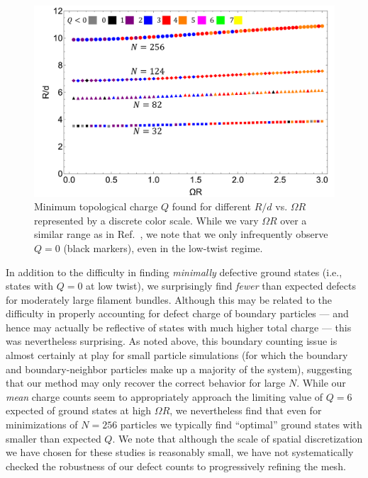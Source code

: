 \documentclass[preprint,12pt]{elsarticle}
\newcounter{bla}
\begin{document}
\begin{figure}
    \centering
    \includegraphics[width=1.0\linewidth]{mincounts_v4.pdf}
    \caption{Minimum topological charge $Q$ found for different $R/d$ vs. 
$\Omega R$ represented by a discrete color scale. While we vary $\Omega R$ over a similar range as in Ref.~\cite{bruss2012non}, we note that we only infrequently observe $Q=0$ (black markers), even in the low-twist regime. }
    \label{fig:minCharge} 
\end{figure}

In addition to the difficulty in finding \emph{minimally} defective ground states (i.e., states with $Q=0$ at low twist), we surprisingly find \emph{fewer} than expected defects for moderately large filament bundles.
Although this may be related to the difficulty in properly accounting for defect charge of boundary particles --- and hence may actually be reflective of states with much higher total charge --- this was nevertheless surprising.
As noted above, this boundary counting issue is almost certainly at play for small particle simulations (for which the boundary and boundary-neighbor particles make up a majority of the system), suggesting that our method may only recover the correct behavior for large $N$.
While our \emph{mean} charge counts seem to appropriately approach the limiting value of $Q=6$ expected of ground states at high $\Omega R$, we nevertheless find that even for minimizations of $N=256$ particles we typically find ``optimal'' ground states with smaller than expected $Q$.
We note that although the scale of spatial discretization we have chosen for these studies is reasonably small, we have not systematically checked the robustness of our defect counts to progressively refining the mesh.
\end{document}
